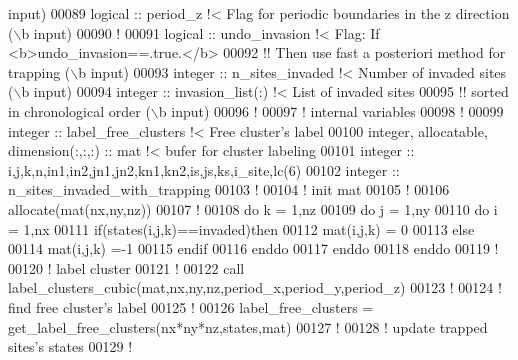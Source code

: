 \begin{DoxyCode}
{       input)}
00089     \textcolor{keywordtype}{logical} :: period\_z \textcolor{comment}{!< Flag for periodic boundaries in the z direction (\(\backslash\)b
       input)}
00090     \textcolor{comment}{!}
00091     \textcolor{keywordtype}{logical} :: undo\_invasion \textcolor{comment}{!< Flag: If <b>undo\_invasion==.true.</b>}
00092     \textcolor{comment}{!! Then use fast a posteriori method for trapping (\(\backslash\)b input)}
00093     \textcolor{keywordtype}{integer} :: n\_sites\_invaded \textcolor{comment}{!< Number of invaded sites (\(\backslash\)b input)}
00094     \textcolor{keywordtype}{integer} :: invasion\_list(:) \textcolor{comment}{!< List of invaded sites }
00095     \textcolor{comment}{!! sorted in chronological order (\(\backslash\)b input)}
00096     \textcolor{comment}{!}
00097     \textcolor{comment}{! internal variables}
00098     \textcolor{comment}{! }
00099     \textcolor{keywordtype}{integer} :: label\_free\_clusters \textcolor{comment}{!< Free cluster's label}
00100     \textcolor{keywordtype}{integer}, \textcolor{keywordtype}{allocatable}, \textcolor{keywordtype}{dimension(:,:,:)} :: mat \textcolor{comment}{!< bufer for cluster labeling}
00101     \textcolor{keywordtype}{integer} :: i,j,k,n,in1,in2,jn1,jn2,kn1,kn2,is,js,ks,i\_site,lc(6)
00102     \textcolor{keywordtype}{integer} :: n\_sites\_invaded\_with\_trapping
00103     \textcolor{comment}{!}
00104     \textcolor{comment}{! init mat}
00105     \textcolor{comment}{!}
00106     \textcolor{keyword}{allocate}(mat(nx,ny,nz))
00107     \textcolor{comment}{!}
00108     \textcolor{keyword}{do} k = 1,nz
00109        \textcolor{keyword}{do} j = 1,ny
00110           \textcolor{keyword}{do} i = 1,nx
00111              \textcolor{keyword}{if}(states(i,j,k)==invaded)\textcolor{keyword}{then}
00112                 mat(i,j,k) = 0
00113              \textcolor{keyword}{else}
00114                 mat(i,j,k) =-1
00115              \textcolor{keyword}{endif}
00116           \textcolor{keyword}{enddo}
00117        \textcolor{keyword}{enddo}
00118     \textcolor{keyword}{enddo}
00119     \textcolor{comment}{!}
00120     \textcolor{comment}{! label cluster}
00121     \textcolor{comment}{!}
00122     call label\_clusters\_cubic(mat,nx,ny,nz,period\_x,period\_y,period\_z)
00123     \textcolor{comment}{!}
00124     \textcolor{comment}{! find free cluster's label}
00125     \textcolor{comment}{!}
00126     label\_free\_clusters = get\_label\_free\_clusters(nx*ny*nz,states,mat)
00127     \textcolor{comment}{!}
00128     \textcolor{comment}{! update trapped sites's states}
00129     \textcolor{comment}{!}

\end{DoxyCode}
